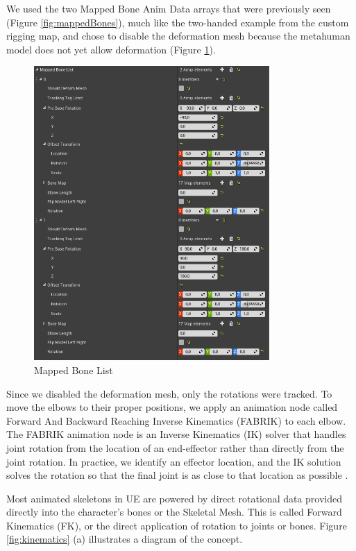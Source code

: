 We used the two Mapped Bone Anim Data arrays that were previously seen (Figure \ref{fig:mappedBones}), much like the two-handed example from the custom rigging map, and chose to disable the deformation mesh because the metahuman model does not yet allow deformation (Figure \ref{fig:mappedBoneList}).

\begin{figure}[!htb]
\includegraphics[width=0.8\textwidth]{figures/mappedBoneList.png}
\centering
\caption{Mapped Bone List}
\label{fig:mappedBoneList}
\end{figure}

Since we disabled the deformation mesh, only the rotations were tracked. To move the elbows to their proper positions, we apply an animation node called Forward And Backward Reaching Inverse Kinematics (FABRIK) to each elbow. The FABRIK animation node is an Inverse Kinematics (IK) solver that handles joint rotation from the location of an end-effector rather than directly from the joint rotation. In practice, we identify an effector location, and the IK solution solves the rotation so that the final joint is as close to that location as possible \cite{IK}.

Most animated skeletons in UE are powered by direct rotational data provided directly into the character's bones or the Skeletal Mesh. This is called Forward Kinematics (FK), or the direct application of rotation to joints or bones. Figure \ref{fig:kinematics} (a) illustrates a diagram of the concept.

